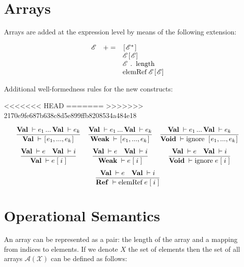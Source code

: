 \documentclass{article}
\author{Dmitry Boulytchev}
\newcommand{\trule}[2]{\dfrac{#1}{#2}}
\newcommand{\withenv}[2]{{#1}\vdash{#2}}
\newcommand{\llang}[1]{\mbox{\lstinline[mathescape]|#1|}}
\newcommand{\primi}[2]{\mathbf{#1}\;{#2}}
\theoremstyle{definition}
\begin{document}
\section{Arrays}

Arrays are added at the expression level by means of the following extension:

\[
\begin{array}{rcl}
  \mathscr E & += & \llang{[}\mathscr E^*\llang{]} \\
             &    & \mathscr E \llang{[$\mathscr E$]} \\
             &    & \mathscr E \;\llang{. length} \\
             &    & \llang{elemRef}\; \mathscr E\llang{[$\mathscr E$]}
\end{array}
\]

Additional well-formedness rules for the new constructs:

<<<<<<< HEAD
\newcommand{\Ref}{\primi{Ref}{}}
=======
\renewcommand{\Ref}{\primi{Ref}{}}
>>>>>>> 2170e9fe687b638c8d5e899ffb8208534a484e18
\newcommand{\Val}{\primi{Val}{}}
\newcommand{\Void}{\primi{Void}{}}
\newcommand{\Weak}{\primi{Weak}{}}

\[
\begin{array}{ccc}
  \trule{\withenv{\Val}{e_1}\,...\,\withenv{\Val}{e_k}}{\withenv{\Val}{\llang{[}e_1,...,e_k\llang{]}}} &
  \trule{\withenv{\Val}{e_1}\,...\,\withenv{\Val}{e_k}}{\withenv{\Weak}{\llang{[}e_1,...,e_k\llang{]}}} &
  \trule{\withenv{\Val}{e_1}\,...\,\withenv{\Val}{e_k}}{\withenv{\Void}{\llang{ignore [}e_1,...,e_k\llang{]}}} \\[5mm]
  \trule{\withenv{\Val}{e}\quad\withenv{\Val}{i}}{\withenv{\Val}{\llang{$e\;$[$\;i\;$]}}} &
  \trule{\withenv{\Val}{e}\quad\withenv{\Val}{i}}{\withenv{\Weak}{\llang{$e\;$[$\;i\;$]}}} &
  \trule{\withenv{\Val}{e}\quad\withenv{\Val}{i}}{\withenv{\Void}{\llang{ignore $\;e\;$[$\;i\;$]}}}\\[5mm]
  \multicolumn{3}{c}{\trule{\withenv{\Val}{e}\quad\withenv{\Val}{i}}{\withenv{\Ref}{\llang{elemRef $\;e\;$[$\;i\;$]}}}}
\end{array}
\]

\section{Operational Semantics}

An array can be represented as a pair: the length of the array and a mapping from indices to elements. If we denote
$X$ the set of elements then the set of all arrays $\mathscr A (\mathscr X)$ can be defined as follows:
\end{document}
